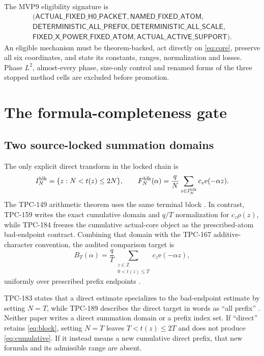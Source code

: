 \documentclass[11pt]{article}
\newcommand{\e}{\mathrm e}
\begin{document}
The MVP9 eligibility signature is \citep{WangTPC192}
\begin{equation}
\begin{gathered}
(\mathsf{ACTUAL\_FIXED\_H0\_PACKET},
 \mathsf{NAMED\_FIXED\_ATOM},\\
 \mathsf{DETERMINISTIC\_ALL\_PREFIX},
 \mathsf{DETERMINISTIC\_ALL\_SCALE},\\
 \mathsf{FIXED\_X\_POWER\_FIXED\_ATOM},
 \mathsf{ACTUAL\_ACTIVE\_SUPPORT}).
\end{gathered}
\end{equation}
An eligible mechanism must be theorem-backed, act directly on
\eqref{eq:core}, preserve all six coordinates, and state its constants,
ranges, normalization and losses.  Phase \(L^2\), almost-every phase,
size-only control and renamed forms of the three stopped method cells are
excluded before promotion.

\section{The formula-completeness gate}

\subsection{Two source-locked summation domains}

The only explicit direct transform in the locked chain is
\begin{equation}
 I_N^{\rm blk}=\{z:N<t(z)\le2N\},\qquad
 F_N^{\rm blk}(\alpha)
 =\frac qN\sum_{z\in I_N^{\rm blk}}c_z\e(-\alpha z).
\label{eq:block}
\end{equation}
The TPC-149 arithmetic theorem uses the same terminal block
\citep{WangTPC149}.  In contrast, TPC-159 writes the exact cumulative
domain and \(q/T\) normalization for \(c_z\rho(z)\), while TPC-184 freezes
the cumulative actual-core object as the prescribed-atom bad-endpoint
contract.  Combining that domain with the TPC-167 additive-character
convention, the audited comparison target is
\begin{equation}
 B_T(\alpha)
 =\frac qT\sum_{\substack{z\in\mathbb Z\\0<t(z)\le T}}
 c_z\e(-\alpha z),
\label{eq:cumulative}
\end{equation}
uniformly over prescribed prefix endpoints
\citep{WangTPC159,WangTPC167,WangTPC184}.

TPC-183 states that a direct estimate specializes to the bad-endpoint
estimate by setting \(N=T\), while TPC-189 describes the direct target in
words as ``all prefix'' \citep{WangTPC183,WangTPC189}.  Neither paper writes
a direct summation domain or a prefix index set.  If ``direct'' retains
\eqref{eq:block}, setting \(N=T\) leaves \(T<t(z)\le2T\) and does not
produce \eqref{eq:cumulative}.  If it instead means a new cumulative
direct prefix, that new formula and its admissible range are absent.
\end{document}
